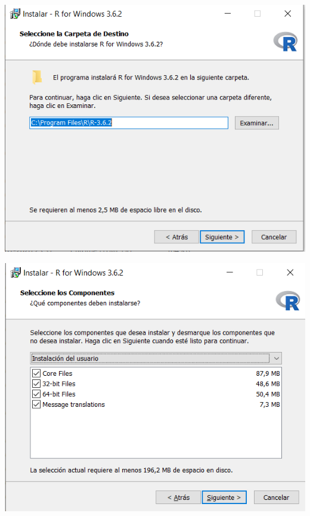 \documentclass[
]{article}
\begin{document}
\begin{center}\includegraphics[width=8.12in]{./figs/Instalacion R- Win (2)} \end{center}

\begin{center}\includegraphics[width=8.07in]{./figs/Instalacion R- Win (3)} \end{center}
\end{document}
